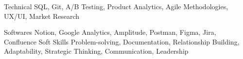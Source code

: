 

\begin{cvskills}

  \cvskill
    {Technical} %
    {SQL, Git, A/B Testing, Product Analytics, Agile Methodologies, UX/UI, Market Research} %

  \cvskill
    {Softwares} %
    {Notion, Google Analytics, Amplitude, Postman, Figma, Jira, Confluence} %
  \cvskill
    {Soft Skills} %
    {Problem-solving, Documentation, Relationship Building, Adaptability, Strategic Thinking, Communication, Leadership} %

\end{cvskills}
